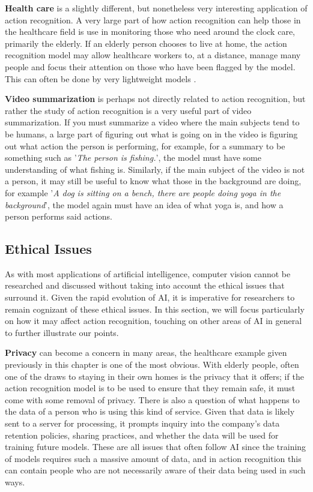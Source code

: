 \textbf{Health care} is a slightly different, but nonetheless very interesting application of action recognition. A very large part of how action recognition can help those in the healthcare field is use in monitoring those who need around the clock care, primarily the elderly. If an elderly person chooses to live at home, the action recognition model may allow healthcare workers to, at a distance, manage many people and focus their attention on those who have been flagged by the model. This can often be done by very lightweight models \cite{Eldermonitoring}.

\textbf{Video summarization} is perhaps not directly related to action recognition, but rather the study of action recognition is a very useful part of video summarization. If you must summarize a video where the main subjects tend to be humans, a large part of figuring out what is going on in the video is figuring out what action the person is performing, for example, for a summary to be something such as '\textit{The person is fishing.}', the model must have some understanding of what fishing is. Similarly, if the main subject of the video is not a person, it may still be useful to know what those in the background are doing, for example '\textit{A dog is sitting on a bench, there are people doing yoga in the background}', the model again must have an idea of what yoga is, and how a person performs said actions.

\subsection{Ethical Issues}

As with most applications of artificial intelligence, computer vision cannot be researched and discussed without taking into account the ethical issues that surround it. Given the rapid evolution of AI, it is imperative for researchers to remain cognizant of these ethical issues. In this section, we will focus particularly on how it may affect action recognition, touching on other areas of AI in general to further illustrate our points.

\textbf{Privacy} can become a concern in many areas, the healthcare example given previously in this chapter is one of the most obvious. With elderly people, often one of the draws to staying in their own homes is the privacy that it offers; if the action recognition model is to be used to ensure that they remain safe, it must come with some removal of privacy. There is also a question of what happens to the data of a person who is using this kind of service. Given that data is likely sent to a server for processing, it prompts inquiry into the company's data retention policies, sharing practices, and whether the data will be used for training future models. These are all issues that often follow AI since the training of models requires such a massive amount of data, and in action recognition this can contain people who are not necessarily aware of their data being used in such ways.

